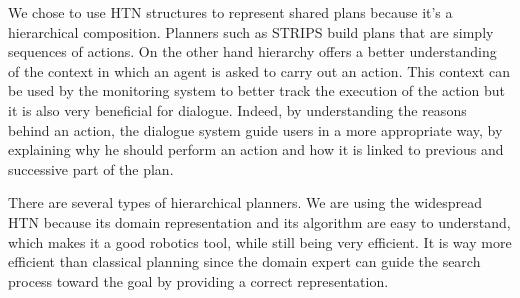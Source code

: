 \documentclass{llncs}
\begin{document}





We chose to use HTN structures to represent shared plans because it's a hierarchical composition. Planners such as STRIPS \cite{strips71} build plans that are simply sequences of actions. On the other hand hierarchy offers a better understanding of the context in which an agent is asked to carry out an action. This context can be used by the monitoring system to better track the execution of the action but it is also very beneficial for dialogue. Indeed, by understanding the reasons behind an action, the dialogue system guide users in a more appropriate way, by explaining why he should perform an action and how it is linked to previous and successive part of the plan. 


There are several types of hierarchical planners. We are using the widespread HTN because its domain representation and its algorithm are easy to understand, which makes it a good robotics tool, while still being very efficient. It is way more efficient than classical planning since the domain expert can guide the search process toward the goal by providing a correct representation. 
\end{document}
